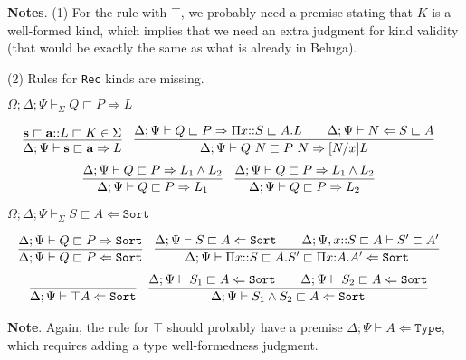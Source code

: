 \documentclass[letterpaper, 11pt]{article}
\newcommand{\Rar}{\Rightarrow}
\newcommand{\Lar}{\Leftarrow}
\newcommand{\Type}{\texttt{Type}}
\newcommand{\Sort}{\texttt{Sort}}
\begin{document}
    \textbf{Notes}. (1) For the rule with $\top$, we probably need a premise stating that $K$ is a well-formed kind, which implies that we need an extra
    judgment for kind validity (that would be exactly the same as what is already in Beluga).

    (2) Rules for \texttt{Rec} kinds are missing.

    $\boxed{\Omega; \Delta; \Psi \vdash_\Sigma Q \sqsubset P \Rar L}$

    \begin{align*}
      & \infer{\Delta ; \Psi \vdash \textbf{s} \sqsubset \textbf{a} \Rar L}
        {
          \textbf{s} \sqsubset \textbf{a} {::} L \sqsubset K \in \Sigma
        } &
      & \infer{\Delta; \Psi \vdash Q \ N \sqsubset P \ N \Rar [N/x]L}
        {
          \Delta ; \Psi \vdash Q \sqsubset P \Rar \Pi x{::}S \sqsubset A. L
          &&
          \Delta ; \Psi \vdash N \Lar S \sqsubset A
        }
    \end{align*}
    \begin{align*}
      & \infer{\Delta ; \Psi \vdash Q \sqsubset P \Rar L_1}
        {
          \Delta ; \Psi \vdash Q \sqsubset P \Rar L_1 \land L_2
        } &
      & \infer{\Delta ; \Psi \vdash Q \sqsubset P \Rar L_2}
        {
          \Delta ; \Psi \vdash Q \sqsubset P \Rar L_1 \land L_2
        }
    \end{align*}

    $\boxed{\Omega ; \Delta ; \Psi \vdash_\Sigma S \sqsubset A \Lar \Sort}$

    \begin{align*}
      & \infer{\Delta; \Psi \vdash Q \sqsubset P \Lar \Sort}
        {
          \Delta; \Psi \vdash Q \sqsubset P \Rar \Sort
        } &
      & \infer{\Delta; \Psi \vdash \Pi x{::}S \sqsubset A. S' \sqsubset \Pi x{:}A.A' \Lar \Sort}
        {
          \Delta; \Psi \vdash S \sqsubset A \Lar \Sort
          &&
          \Delta; \Psi, x{::}S \sqsubset A \vdash S' \sqsubset A'
        }
    \end{align*}
    \begin{align*}
      & \infer{\Delta; \Psi \vdash \top A \Lar \Sort}{} &
      & \infer{\Delta; \Psi \vdash S_1 \land S_2 \sqsubset A \Lar \Sort}
        {
          \Delta; \Psi \vdash S_1 \sqsubset A \Lar \Sort
          &&
          \Delta; \Psi \vdash S_2 \sqsubset A \Lar \Sort
        }
    \end{align*}

    \textbf{Note}.  Again, the rule for $\top$ should probably have a premise $\Delta; \Psi \vdash A \Lar \Type$, which requires adding
    a type well-formedness judgment.
\end{document}
